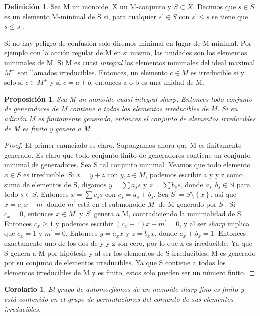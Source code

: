 \documentclass[12pt,spanish]{amsart}
\newcommand{\bb}[1]{\mathbb{#1}}
\newcommand{\set}[1]{\left\{{#1}\right\}}
\newtheorem{prop}[Theorem]{Proposición}
\newtheorem{cor}[Theorem]{Corolario}
\theoremstyle{definition}
\newtheorem{Def}[Theorem]{Definición}
\theoremstyle{remark}
\begin{document}
\begin{Def}
Sea M un monoide, X un M-conjunto y $S\subset X$. Decimos que $s\in S$ es un elemento M-minimal de S si, para cualquier $s^{\prime} \in S$ con $s^{\prime} \leq s$ se tiene que $s\leq s^{\prime}$.
\end{Def}
Si no hay peligro de confusión solo diremos minimal en lugar de M-minimal. Por ejemplo con la acción regular de M en si mismo, las unidades son los elementos minimales de M. Si M es cuasi \textit{integral} los elementos minimales del ideal maximal $M^{+}$ son llamados irreducibles. Entonces, un elemento $c\in M$ es irreducible si y solo si $c\in M^{+}$ y si $c=a+b$, entonces a o b es una unidad de M. 

\begin{prop}
Sea M un monoide cuasi \textit{integral} \textit{sharp}. Entonces todo conjunto de generadores de M contiene a todos los elementos irreducibles de M. Si en adición M es finitamente generado, entonces el conjunto de elementos irreducibles de M es finito y genera a M. 
\end{prop}

\begin{proof}
 El primer enunciado es claro. Supongamos ahora que M es finitamente generado. Es claro que todo conjunto finito de generadores contiene un conjunto minimal de generadores. Sea S tal conjunto minimal. Veamos que todo elemento $x\in S$ es irreducible. Si $x=y+z$ con $y,z\in M$, podemos escribir a y y z como suma de elementos de S, digamos $y=\sum a_{s}s$ y $z=\sum b_{s}s$, donde $a_{s},b_{s}\in \bb{N}$ para todo $s\in S$. Entonces $x=\sum c_{s}s$ con $c_{s}=a_{s}+b_{s}$. Sea $S^{\prime} = S\setminus \set{x}$, así que $x=c_{x}x+m^{\prime}$ donde $m^{\prime}$ está en el submonoide $M^{\prime}$ de M generado por $S^{\prime}$. Si $c_{x}=0$, entonces $x\in M^{\prime}$ y $S^{\prime}$ genera a M, contradiciendo la minimalidad de S. Entonces $c_{x}\geq 1$ y podemos escribir $(c_{x}-1)x+m^{\prime}=0$, y al ser \textit{sharp} implica que $c_{x}=1$ y $m^{\prime}=0$. Entonces $y=a_{x}x$ y $z=b_{x}x$, donde $a_{x}+b_{x}=1$. Entonces exactamente uno de los dos de y y z son cero, por lo que x es irreducible. Ya que S genera a M por hipótesis y al ser los elementos de S irreducibles, M es generado por su conjunto de elementos irreducibles. Ya que S contiene a todos los elementos irreducibles de M y es finito, estos solo pueden ser un número finito.  
\end{proof}


\begin{cor}
El grupo de automorfismos de un monoide \textit{sharp} fino es finito y está contenido en el grupo de permutaciones del conjunto de sus elementos irreducibles. 
\end{cor}
\end{document}
